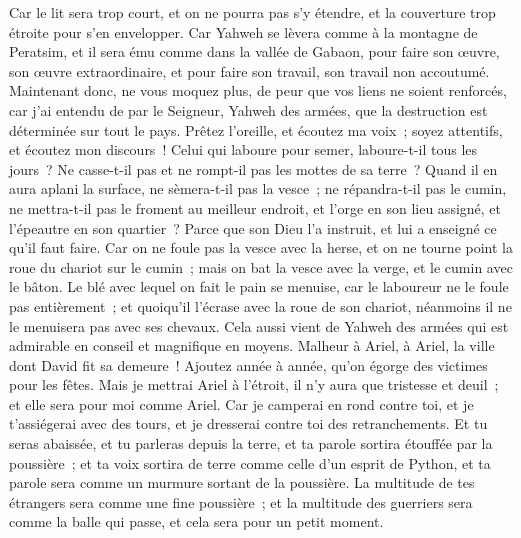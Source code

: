 \begin{multicols}{2}
Car le lit sera trop court, et on ne pourra pas s'y étendre, et la couverture trop étroite pour s'en envelopper.
Car Yahweh se lèvera comme à la montagne de Peratsim, et il sera ému comme dans la vallée de Gabaon, pour faire son œuvre, son œuvre extraordinaire, et pour faire son travail, son travail non accoutumé.
Maintenant donc, ne vous moquez plus, de peur que vos liens ne soient renforcés, car j'ai entendu de par le Seigneur, Yahweh des armées, que la destruction est déterminée sur tout le pays. 
Prêtez l'oreille, et écoutez ma voix~; soyez attentifs, et écoutez mon discours~!
Celui qui laboure pour semer, laboure-t-il tous les jours~? Ne casse-t-il pas et ne rompt-il pas les mottes de sa terre~? 
Quand il en aura aplani la surface, ne sèmera-t-il pas la vesce~; ne répandra-t-il pas le cumin, ne mettra-t-il pas le froment au meilleur endroit, et l'orge en son lieu assigné, et l'épeautre en son quartier~?
Parce que son Dieu l'a instruit, et lui a enseigné ce qu'il faut faire.
Car on ne foule pas la vesce avec la herse, et on ne tourne point la roue du chariot sur le cumin~; mais on bat la vesce avec la verge, et le cumin avec le bâton.
Le blé avec lequel on fait le pain se menuise, car le laboureur ne le foule pas entièrement~; et quoiqu'il l'écrase avec la roue de son chariot, néanmoins il ne le menuisera pas avec ses chevaux.
Cela aussi vient de Yahweh des armées qui est admirable en conseil et magnifique en moyens.
\VerseOne{}Malheur à Ariel, à Ariel, la ville dont David fit sa demeure~! Ajoutez année à année, qu'on égorge des victimes pour les fêtes.
Mais je mettrai Ariel à l'étroit, il n'y aura que tristesse et deuil~; et elle sera pour moi comme Ariel.
Car je camperai en rond contre toi, et je t'assiégerai avec des tours, et je dresserai contre toi des retranchements.
Et tu seras abaissée, et tu parleras depuis la terre, et ta parole sortira étouffée par la poussière~; et ta voix sortira de terre comme celle d'un esprit de Python, et ta parole sera comme un murmure sortant de la poussière.
La multitude de tes étrangers sera comme une fine poussière~; et la multitude des guerriers sera comme la balle qui passe, et cela sera pour un petit moment.

\end{multicols}
